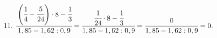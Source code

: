 11. $\cfrac{\left(\cfrac{1}{4}-\cfrac{5}{24}\right)\cdot 8-\cfrac{1}{3}}{1,85-1,62:0,9}=
\cfrac{\cfrac{1}{24}\cdot 8-\cfrac{1}{3}}{1,85-1,62:0,9}=\cfrac{0}{1,85-1,62:0,9}=0.$\\
